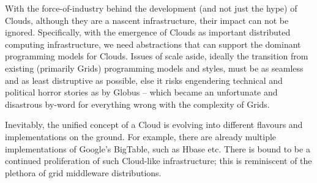 \documentclass[conference,final]{IEEEtran}
\begin{document}
With the force-of-industry behind the development (and not just the
hype) of Clouds, although they are a nascent infrastructure, their
impact can not be ignored.  Specifically, with the emergence of Clouds
as important distributed computing infrastructure, we need
abstractions that can support the dominant programming models for
Clouds. Issues of scale aside, ideally the transition from existing
(primarily Grids) programming models and styles, must be as seamless
and as least distruptive as possible, else it risks engendering
technical and political horror stories as by Globus -- which became an
unfortunate and disastrous by-word for everything wrong with the
complexity of Grids.

Inevitably, the unified concept of a Cloud is evolving into different
flavours and implementations on the ground. For example, there are
already multiple implementations of Google's BigTable, such as Hbase
etc.  There is bound to be a continued proliferation of such
Cloud-like infrastructure; this is reminiscent of the plethora of grid
middleware distributions.
\end{document}
